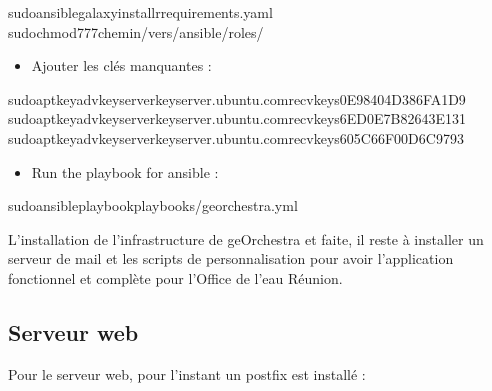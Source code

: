 \documentclass[letterpaper,10pt,french]{sphinxmanual}
\begin{document}
\begin{sphinxVerbatim}[commandchars=\\\{\}]
sudoansible\PYGZhy{}galaxyinstall\PYGZhy{}rrequirements.yaml
sudochmod\PYGZhy{}777chemin/vers/ansible/roles/
\end{sphinxVerbatim}
\begin{itemize}
\item {} 
\sphinxAtStartPar
Ajouter les clés manquantes :

\end{itemize}

\begin{sphinxVerbatim}[commandchars=\\\{\}]
sudoapt\PYGZhy{}keyadv\PYGZhy{}\PYGZhy{}keyserverkeyserver.ubuntu.com\PYGZhy{}\PYGZhy{}recv\PYGZhy{}keys0E98404D386FA1D9
sudoapt\PYGZhy{}keyadv\PYGZhy{}\PYGZhy{}keyserverkeyserver.ubuntu.com\PYGZhy{}\PYGZhy{}recv\PYGZhy{}keys6ED0E7B82643E131
sudoapt\PYGZhy{}keyadv\PYGZhy{}\PYGZhy{}keyserverkeyserver.ubuntu.com\PYGZhy{}\PYGZhy{}recv\PYGZhy{}keys605C66F00D6C9793
\end{sphinxVerbatim}
\begin{itemize}
\item {} 
\sphinxAtStartPar
Run the playbook for ansible :

\end{itemize}

\begin{sphinxVerbatim}[commandchars=\\\{\}]
sudoansible\PYGZhy{}playbookplaybooks/georchestra.yml
\end{sphinxVerbatim}

\sphinxAtStartPar
L’installation de l’infrastructure de geOrchestra et faite, il reste à installer un serveur de mail et les scripts de personnalisation pour avoir
l’application fonctionnel et complète pour l’Office de l’eau Réunion.


\subsection{Serveur web}
\label{\detokenize{doc_instal/installation:serveur-web}}
\sphinxAtStartPar
Pour le serveur web, pour l’instant un postfix est installé :
\end{document}
